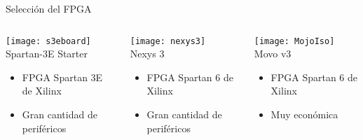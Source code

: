 \begin{frame}{Selección del FPGA}
	\begin{columns}
		\begin{column}{.28\textwidth}
			\centering
			\texttt{[image: s3eboard]}\\
			\centering
			Spartan-3E Starter\\
			\begin{itemize}
				\item FPGA Spartan 3E de Xilinx
				\item Gran cantidad de periféricos
			\end{itemize}
		\end{column}
		\begin{column}{.28\textwidth}
			\centering
			\texttt{[image: nexys3]}\\
			\centering
			Nexys 3\\
			\begin{itemize}
				\item FPGA Spartan 6 de Xilinx
				\item Gran cantidad de periféricos
			\end{itemize}
		\end{column}
		\begin{column}{.28\textwidth}
			\centering
			\texttt{[image: MojoIso]}\\
			\centering
			\alert<2>{Movo v3\\}
			\begin{itemize}
				\item FPGA Spartan 6 de Xilinx
				\item Muy económica
			\end{itemize}
		\end{column}
	\end{columns}
\end{frame}

